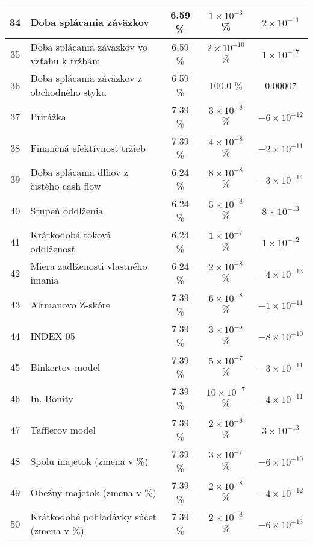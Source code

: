 \begin{longtable}{ |c|p{5cm}|c|c|c| }
        \hline
        34 & Doba splácania záväzkov & 6.59 \% & \(1 \times 10^{-3}\) \% & \(2 \times 10^{-11}\) \\
        \hline
        35 & Doba splácania záväzkov vo vzťahu k tržbám & 6.59 \% & \(2 \times 10^{-10}\) \% & \(1 \times 10^{-17}\) \\
        \hline
        36 & Doba splácania záväzkov z obchodného styku & 6.59 \% & 100.0 \% & 0.00007 \\
        \hline
        37 & Prirážka & 7.39 \% & \(3 \times 10^{-8}\) \% & \(-6 \times 10^{-12}\) \\
        \hline
        38 & Finančná efektívnosť tržieb & 7.39 \% & \(4 \times 10^{-8}\) \% & \(-2 \times 10^{-11}\) \\
        \hline
        39 & Doba splácania dlhov z čistého cash flow & 6.24 \% & \(8 \times 10^{-8}\) \% & \(-3 \times 10^{-14}\) \\
        \hline
        40 & Stupeň oddlženia & 6.24 \% & \(5 \times 10^{-8}\) \% & \(8 \times 10^{-13}\) \\
        \hline
        41 & Krátkodobá toková oddlženosť & 6.24 \% & \(1 \times 10^{-7}\) \% & \(1 \times 10^{-12}\) \\
        \hline
        42 & Miera zadlženosti vlastného imania & 6.24 \% & \(2 \times 10^{-8}\) \% & \(-4 \times 10^{-13}\) \\
        \hline
        43 & Altmanovo Z-skóre & 7.39 \% & \(6 \times 10^{-8}\) \% & \(-1 \times 10^{-11}\) \\
        \hline
        44 & INDEX 05 & 7.39 \% & \(3 \times 10^{-5}\) \% & \(-8 \times 10^{-10}\) \\
        \hline
        45 & Binkertov model & 7.39 \% & \(5 \times 10^{-7}\) \% & \(-3 \times 10^{-11}\) \\
        \hline
        46 & In. Bonity & 7.39 \% & \(10 \times 10^{-7}\) \% & \(-4 \times 10^{-11}\) \\
        \hline
        47 & Tafflerov model & 7.39 \% & \(2 \times 10^{-8}\) \% & \(3 \times 10^{-13}\) \\
        \hline
        48 & Spolu majetok (zmena v \%) & 7.39 \% & \(3 \times 10^{-7}\) \% & \(-6 \times 10^{-10}\) \\
        \hline
        49 & Obežný majetok (zmena v \%) & 7.39 \% & \(2 \times 10^{-8}\) \% & \(-4 \times 10^{-12}\) \\
        \hline
        50 & Krátkodobé pohľadávky súčet (zmena v \%) & 7.39 \% & \(2 \times 10^{-8}\) \% & \(-6 \times 10^{-13}\) \\

\end{longtable}
